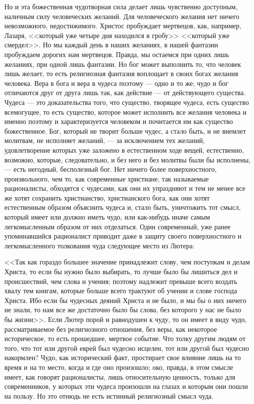 \documentclass[12pt]{article}
\begin{document}
Но и эта божественная чудотворная сила делает лишь чувственно доступным, наличным силу человеческих желаний. Для человеческого желания нет ничего невозможного, недостижимого. Христос пробуждает мертвецов, как, например, Лазаря, <<который уже четыре дня находился в гробу>>  <<который уже смердел>>. Но мы каждый день в наших желаниях, в нашей фантазии пробуждаем дорогих нам мертвецов. Правда, мы остаемся при одних лишь желаниях, при одной лишь фантазии. Но бог может выполнить то, что человек лишь желает, то есть религиозная фантазия воплощает в своих богах желания человека. Вера в бога и вера в чудеса поэтому --- одно и то же; чудо и бог отличаются друг от друга лишь так, как действие --- от действующего существа. Чудеса --- это доказательства того, что существо, творящее чудеса, есть существо всемогущее, то есть существо, которое может исполнить все желания человека и именно поэтому и характеризуется человеком и почитается им как существо божественное. Бог, который не творит больше чудес, а стало быть, и не внемлет молитвам, не исполняет желаний, --- за исключением тех желаний, удовлетворение которых уже заложено в естественном ходе вещей, естественно, возможно, которые, следовательно, и без него и без молитвы были бы исполнены, --- есть негодный, бесполезный бог. Нет ничего более поверхностного, произвольного, чем то, как современные христиане, так называемые рационалисты, обходятся с чудесами, как они их упраздняют и тем не менее все же хотят сохранить христианство, христианского бога, как они хотят естественным образом объяснить чудеса и, стало быть, уничтожить тот смысл, который имеет или должно иметь чудо, или как-нибудь иначе самым легкомысленным образом от них отделаться. Один современный, уже ранее упоминавшийся рационалист приводит даже в защиту своего поверхностного и легкомысленного толкования чуда следующее место из Лютера: 

<<Так как гораздо большее значение принадлежит слову, чем поступкам и делам Христа, то если бы нужно было выбирать, то лучше было бы лишиться дел и происшествий, чем слова и учения; поэтому надлежит превыше всего воздать хвалу тем книгам, которые больше всего трактуют об учении и слове господа Христа. Ибо если бы чудесных деяний Христа и не было, и мы бы о них ничего не знали, то нам все же достаточно было бы слова, без которого у нас не было бы жизни>>. Если Лютер порой и равнодушен к чуду, то он имеет в виду чудо, рассматриваемое без религиозного отношения, без веры, как некоторое историческое, то есть прошедшее, мертвое событие. Что толку другим людям от того, что тот или другой еврей был чудесно исцелен, тот или другой был чудесно накормлен? Чудо, как исторический факт, простирает свое влияние лишь на то время и на то место, когда и где оно произошло; око, правда, в этом смысле имеет, как говорят рационалисты, лишь относительную ценность, только для современников, у которых эти чудеса произошли на глазах и которым они пошли на пользу. Но это отнюдь не есть истинный религиозный смысл чуда. 
\end{document}
